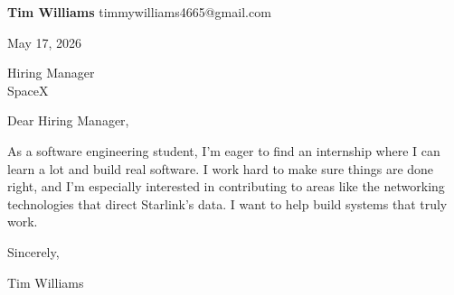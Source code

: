 \documentclass[12pt]{article}
\begin{document}
\textbf{Tim Williams} \hfill timmywilliams4665@gmail.com

\vspace{1em}

May 17, 2026

\vspace{1em}

Hiring Manager \\
SpaceX

\vspace{1em}

Dear Hiring Manager,

As a software engineering student, I'm eager to find an internship where I can learn a lot and build real software. I work hard to make sure things are done right, and I'm especially interested in contributing to areas like the networking technologies that direct Starlink's data. I want to help build systems that truly work.

\vspace{1em}

Sincerely,

\vspace{2em}

Tim Williams
\end{document}
